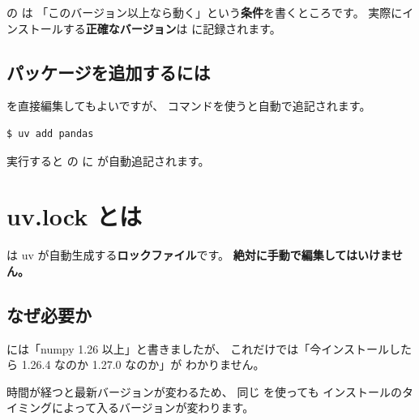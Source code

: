 \begin{notebox}
 の  は
「このバージョン以上なら動く」という\textbf{条件}を書くところです。
実際にインストールする\textbf{正確なバージョン}は
 に記録されます。
\end{notebox}

\subsection{パッケージを追加するには}

 を直接編集してもよいですが、
 コマンドを使うと自動で追記されます。

\begin{wslbox}[パッケージの追加]
\begin{lstlisting}[style=bash]
$ uv add pandas
\end{lstlisting}
\end{wslbox}

実行すると  の  に
 が自動追記されます。

\section{uv.lock とは}

 は uv が自動生成する\textbf{ロックファイル}です。
\textbf{絶対に手動で編集してはいけません。}

\subsection{なぜ必要か}

 には「numpy 1.26 以上」と書きましたが、
これだけでは「今インストールしたら 1.26.4 なのか 1.27.0 なのか」が
わかりません。

時間が経つと最新バージョンが変わるため、
同じ  を使っても
インストールのタイミングによって入るバージョンが変わります。

\begin{center}
\end{center}

